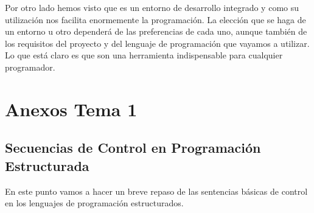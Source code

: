 Por otro lado hemos visto que es un entorno de desarrollo integrado y como su utilización nos facilita enormemente la programación. La elección que se haga de un entorno u otro dependerá de las preferencias de cada uno, aunque también de los requisitos del proyecto y del lenguaje de programación que vayamos a utilizar. Lo que está claro es que son una herramienta indispensable para cualquier programador.

\appendix


\chapter{Anexos Tema 1}

\section{Secuencias de Control en Programación Estructurada}
En este punto vamos a hacer un breve repaso de las sentencias básicas de control en los lenguajes de programación estructurados.

